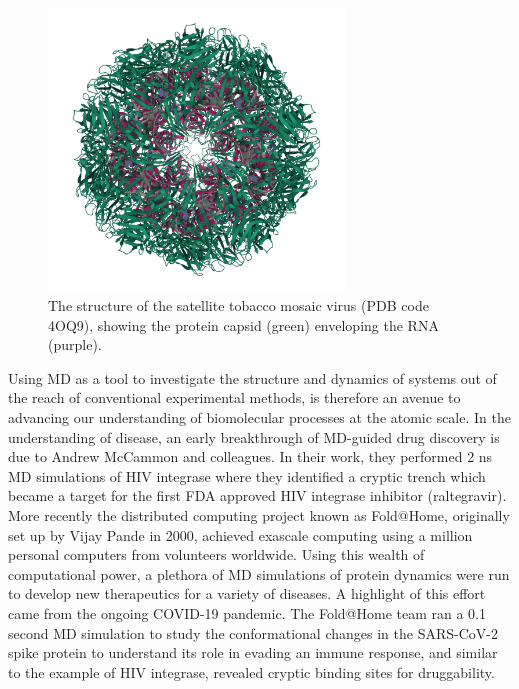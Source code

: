 \begin{figure}[H]
    \centering
    \includegraphics[width=0.7\textwidth]{figures/4OQ9.png}
    \caption{The structure of the satellite tobacco mosaic virus (PDB code 4OQ9), showing the protein capsid (green) enveloping the RNA (purple).\cite{Larson2014}}
    \label{fig:STMV}
\end{figure}
%
Using MD as a tool to investigate the structure and dynamics of systems out of the reach of conventional experimental methods, is therefore an avenue to advancing our understanding of biomolecular processes at the atomic scale. In the understanding of disease, an early breakthrough of MD-guided drug discovery is due to Andrew McCammon and colleagues. In their work, they performed 2 ns MD simulations of HIV integrase where they identified a cryptic trench which became a target for the first FDA approved HIV integrase inhibitor (raltegravir).\cite{schames2004discovery} \\

More recently the distributed computing project known as Fold@Home, originally set up by Vijay Pande in 2000, achieved exascale computing using a million personal computers from volunteers worldwide. Using this wealth of computational power, a plethora of MD simulations of protein dynamics were run to develop new therapeutics for a variety of diseases. A highlight of this effort came from the ongoing COVID-19 pandemic. The Fold@Home team ran a 0.1 second MD simulation to study the conformational changes in the SARS-CoV-2 spike protein to understand its role in evading an immune response, and similar to the example of HIV integrase, revealed cryptic binding sites for druggability.\cite{Zimmerman2020} \\

